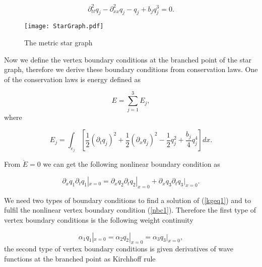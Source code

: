 \documentclass[12pt]{llncs}
\begin{document}
\begin{equation}
\partial_{tt}^2 q_j - \partial_{xx}^2 q_j - q_j + b_{j} q_{j}^3 =
0.\label{kgeq1}
\end{equation}

\begin{figure}[htb]
  \centering

\texttt{[image: StarGraph.pdf]} %
%
  \caption{The metric star graph}\label{pic1}
\end{figure}

Now we define the vertex boundary conditions at the branched point
of the star graph, therefore we derive these boundary conditions
from conservation laws. One of the conservation laws is energy defined as

\begin{equation}
E = \sum_{j=1}^3 E_j,\label{conl1}
\end{equation}
where

\begin{equation}
E_j= \int _{e_j} \left[ \frac{1}{2} (\partial_t q_j)^2 +
\frac{1}{2} (\partial_x q_j)^2 - \frac{1}{2} q_j^2 + \frac{b_j}{4}
q_j^4 \right] dx.\label{energy1}
\end{equation}

From $\dot{E}=0$ we can get the following nonlinear boundary
condition as

\begin{equation}
\partial_x q_1 \partial_t q_1 |_{x=0} = \partial_x q_2 \partial_t q_2 |_{x=0} + \partial_x q_3 \partial_t q_3|_{x=0}.\label{nbc1}
\end{equation}

We need two types of boundary conditions to find a solution of
(\ref{kgeq1}) and to fulfil the nonlinear vertex boundary
condition (\ref{nbc1}). Therefore the first type of vertex
boundary conditions is the following weight continuity

\begin{equation}
 \alpha_1 q_1 |_{x=0}= \alpha_2 q_2 |_{x=0} = \alpha_3 q_3 |_{x=0},\label{wc1}
\end{equation}
the second type of vertex boundary conditions is given derivatives of wave functions at the branched point as Kirchhoff rule
\end{document}
